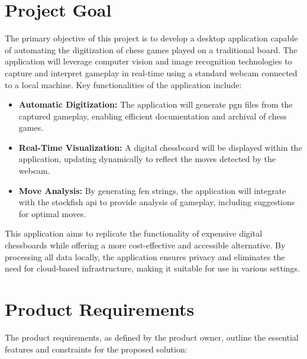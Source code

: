 \section{Project Goal}

The primary objective of this project is to develop a desktop application capable of automating the digitization of chess games played on a traditional board. The application will leverage computer vision and image recognition technologies to capture and interpret gameplay in real-time using a standard webcam connected to a local machine. Key functionalities of the application include:

\begin{itemize}
    \item \textbf{Automatic Digitization:} The application will generate \gls{pgn} files from the captured gameplay, enabling efficient documentation and archival of chess games.

    \item \textbf{Real-Time Visualization:} A digital chessboard will be displayed within the application, updating dynamically to reflect the moves detected by the webcam.

    \item \textbf{Move Analysis:} By generating \gls{fen} strings, the application will integrate with the \gls{stockfish} \gls{api} to provide analysis of gameplay, including suggestions for optimal moves.
\end{itemize}

This application aims to replicate the functionality of expensive digital chessboards while offering a more cost-effective and accessible alternative. By processing all data locally, the application ensures privacy and eliminates the need for cloud-based infrastructure, making it suitable for use in various settings.

\section{Product Requirements}

The product requirements, as defined by the product owner, outline the essential features and constraints for the proposed solution:

